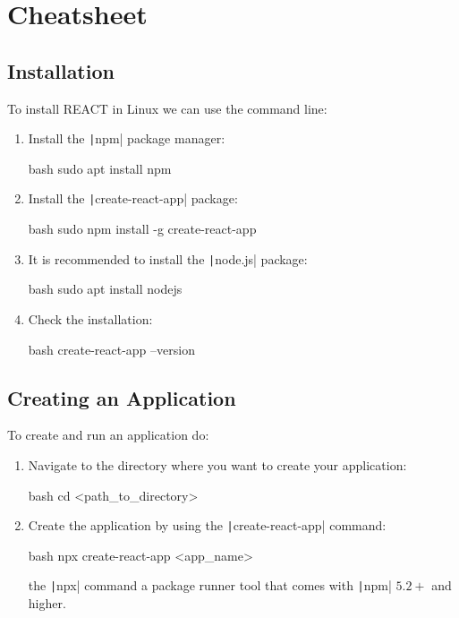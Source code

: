 \section{ Cheatsheet}

\subsection{Installation}

To install REACT in Linux we can use the command line:
\begin{enumerate}
    \item Install the \texttt|npm| package manager:
    \begin{mintedbox}{bash}
sudo apt install npm
    \end{mintedbox}
    \item Install the \texttt|create-react-app| package:
    \begin{mintedbox}{bash}
sudo npm install -g create-react-app
    \end{mintedbox}
    \item It is recommended to install the \texttt|node.js| package:
    \begin{mintedbox}{bash}
sudo apt install nodejs
    \end{mintedbox}
    \item Check the installation:
    \begin{mintedbox}{bash}
create-react-app --version
    \end{mintedbox}
\end{enumerate}

\subsection{Creating an Application}

To create and run an application do:
\begin{enumerate}
    \item Navigate to the directory where you want to create your application:
    \begin{mintedbox}{bash}
cd <path_to_directory>
    \end{mintedbox}
    \item Create the application by using the
    \texttt|create-react-app| command:
    \begin{mintedbox}{bash}
npx create-react-app <app_name>
    \end{mintedbox}
    the \texttt|npx| command a package runner tool that comes with
    \texttt|npm| $5.2+$ and higher.
\end{enumerate}

